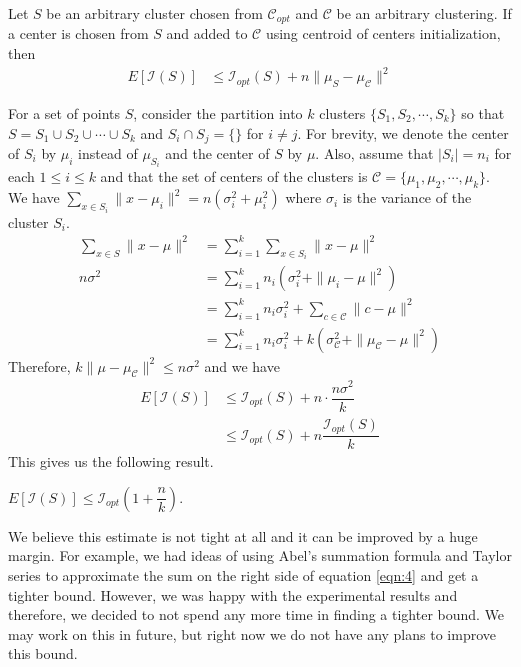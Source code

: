 \documentclass[twoside, 11pt]{article}
\newcommand{\C}{\mathcal{C}}
\newcommand{\I}{\mathcal{I}}
\begin{document}
		\begin{theorem}
			Let $S$ be an arbitrary cluster chosen from $\C_{opt}$ and $\C$ be an arbitrary clustering. If a center is chosen from $S$ and added to $\C$ using centroid of centers initialization, then
				\begin{align*}
					E[\I(S)] & \leq \I_{opt}(S)+n\|\mu_{S}-\mu_{\C}\|^2
				\end{align*}
		\end{theorem}
	For a set of points $S$, consider the partition into $k$ clusters $\{S_1,S_2,\cdots,S_k\}$ so that $S=S_1\cup S_2\cup\cdots\cup S_k$ and $S_i\cap S_j=\{\}$ for $i\neq j$. For brevity, we denote the center of $S_i$ by $\mu_i$ instead of $\mu_{S_i}$ and the center of $S$ by $\mu$. Also, assume that $|S_i|=n_i$ for each $1\leq i\leq k$ and that the set of centers of the clusters is $\mathcal{C}=\{\mu_1,\mu_2,\cdots,\mu_k\}$. We have $\sum_{x\in S_i}\|x-\mu_i\|^2 = n(\sigma_i^2+\mu_i^2)$ where $\sigma_i$ is the variance of the cluster $S_i$.
		\begin{align}
			\sum_{x\in S}\|x-\mu\|^2 
				& = \sum_{i=1}^k\sum_{x\in S_i}\|x-\mu\|^2\nonumber\\
			n\sigma^2
				& = \sum_{i=1}^kn_i(\sigma_i^2+\|\mu_i-\mu\|^2)\nonumber\\
				& = \sum_{i=1}^kn_i\sigma_i^2+\sum_{c\in\C}\|c-\mu\|^2\nonumber\\
				& = \sum_{i=1}^kn_i\sigma_i^2+k(\sigma_{\C}^2+\|\mu_{\C}-\mu\|^2)\label{eqn:4}
		\end{align}
	Therefore, $k\|\mu-\mu_{\C}\|^2\leq n\sigma^2$ and we have
		\begin{align*}
			E[\I(S)] & \leq \I_{opt}(S)+n\cdot\dfrac{n\sigma^2}{k}\\
					 & \leq \I_{opt}(S)+n\dfrac{\I_{opt}(S)}{k}
		\end{align*}
	This gives us the following result.
		\begin{theorem}
			$E[\I(S)]\leq \I_{opt}\left(1+\dfrac{n}{k}\right)$.
		\end{theorem}
	We believe this estimate is not tight at all and it can be improved by a huge margin. For example, we had ideas of using Abel's summation formula \citep[Theorem $4.2$]{apostol} and Taylor series to approximate the sum on the right side of equation \eqref{eqn:4} and get a tighter bound. However, we was happy with the experimental results and therefore, we decided to not spend any more time in finding a tighter bound. We may work on this in future, but right now we do not have any plans to improve this bound.
\end{document}
